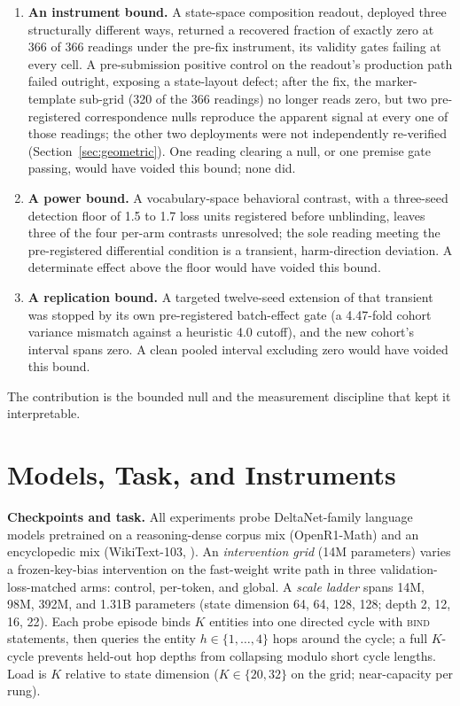 \documentclass{article} %
\begin{document}
\begin{enumerate}[leftmargin=1.5em,itemsep=1pt,topsep=2pt]
\item \textbf{An instrument bound.} A state-space composition readout,
deployed three structurally different ways, returned a recovered fraction of
exactly zero at 366 of 366 readings under the pre-fix instrument,
its validity gates failing at every cell. A pre-submission positive
control on the readout's production path failed outright, exposing a
state-layout defect; %
after the fix, the marker-template sub-grid (320 of the 366 readings) no
longer reads zero, %
but two pre-registered correspondence nulls reproduce the apparent signal
at every one of those readings; %
the other two deployments were not independently re-verified
(Section~\ref{sec:geometric}). One reading clearing a null, or one premise
gate passing, would have voided this bound; none did.
\item \textbf{A power bound.} A vocabulary-space behavioral contrast, with
a three-seed detection floor of 1.5 to 1.7 loss units registered before
unblinding, %
leaves three of the four per-arm contrasts unresolved; the sole reading meeting the
pre-registered differential condition is a transient, harm-direction
deviation. %
A determinate effect above the floor would have voided this bound.
\item \textbf{A replication bound.} A targeted twelve-seed extension of
that transient was stopped by its own pre-registered batch-effect gate
(a 4.47-fold cohort variance mismatch against a heuristic 4.0 cutoff),
and the new cohort's interval spans zero. A clean pooled interval excluding
zero would have voided this bound.
\end{enumerate}

The contribution is the bounded null and the measurement discipline that
kept it interpretable.

\section{Models, Task, and Instruments}
\label{sec:setting}

\textbf{Checkpoints and task.} All experiments probe DeltaNet-family
language models \citep{yang2024parallelizing} pretrained on a
reasoning-dense corpus mix (OpenR1-Math) and an encyclopedic mix
(WikiText-103, \citealp{merity2017pointer}). An \emph{intervention grid}
(14M parameters) varies a frozen-key-bias intervention on the fast-weight
write path in three validation-loss-matched arms: control, per-token, and
global. A \emph{scale ladder} spans 14M, 98M, 392M, and 1.31B parameters
(state dimension 64, 64, 128, 128; depth 2, 12, 16, 22).
Each probe episode binds $K$ entities into one directed cycle with
\textsc{bind} statements, then queries the entity $h \in \{1,\dots,4\}$
hops around the cycle; a full $K$-cycle prevents held-out hop depths from
collapsing modulo short cycle lengths. Load is $K$ relative to state
dimension ($K \in \{20, 32\}$ on the grid; near-capacity per rung).
\end{document}
